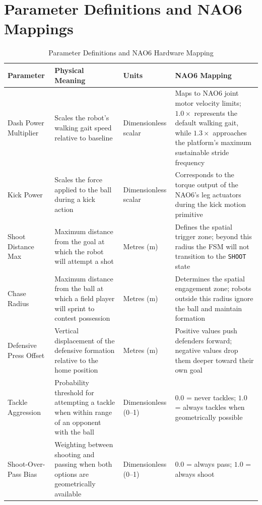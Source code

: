 \documentclass[12pt, a4paper]{report}
\begin{document}
\appendix

\chapter{Parameter Definitions and NAO6 Mappings}
\label{app:params}

\begin{table}[H]
  \centering
  \caption{Parameter Definitions and NAO6 Hardware Mapping}
  \label{tab:param-defs}
  \small
  \begin{tabular}{p{3.0cm} p{3.5cm} p{1.8cm} p{5.0cm}}
    \toprule
    \textbf{Parameter} & \textbf{Physical Meaning} & \textbf{Units}
      & \textbf{NAO6 Mapping} \\
    \midrule
    Dash Power Multiplier
      & Scales the robot's walking gait speed relative to baseline
      & Dimensionless scalar
      & Maps to NAO6 joint motor velocity limits; $1.0\times$ represents
        the default walking gait, while $1.3\times$ approaches the
        platform's maximum sustainable stride frequency \\[4pt]
    Kick Power
      & Scales the force applied to the ball during a kick action
      & Dimensionless scalar
      & Corresponds to the torque output of the NAO6's leg actuators
        during the kick motion primitive \\[4pt]
    Shoot Distance Max
      & Maximum distance from the goal at which the robot will attempt
        a shot
      & Metres (m)
      & Defines the spatial trigger zone; beyond this radius the FSM
        will not transition to the \texttt{SHOOT} state \\[4pt]
    Chase Radius
      & Maximum distance from the ball at which a field player will
        sprint to contest possession
      & Metres (m)
      & Determines the spatial engagement zone; robots outside this
        radius ignore the ball and maintain formation \\[4pt]
    Defensive Press Offset
      & Vertical displacement of the defensive formation relative to
        the home position
      & Metres (m)
      & Positive values push defenders forward; negative values drop
        them deeper toward their own goal \\[4pt]
    Tackle Aggression
      & Probability threshold for attempting a tackle when within range
        of an opponent with the ball
      & Dimensionless (0--1)
      & $0.0$ = never tackles; $1.0$ = always tackles when
        geometrically possible \\[4pt]
    Shoot-Over-Pass Bias
      & Weighting between shooting and passing when both options are
        geometrically available
      & Dimensionless (0--1)
      & $0.0$ = always pass; $1.0$ = always shoot \\
    \bottomrule
  \end{tabular}
\end{table}
\end{document}
